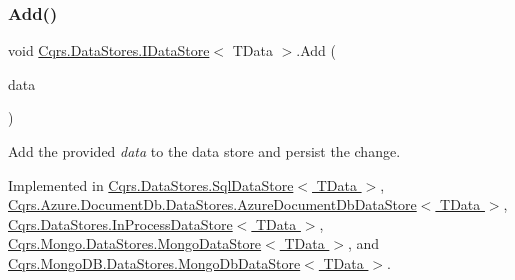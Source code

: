 \mbox{\label{interfaceCqrs_1_1DataStores_1_1IDataStore_a906f3f2f80db7a549a4170eca4653e26_a906f3f2f80db7a549a4170eca4653e26}} 
\subsubsection{\texorpdfstring{Add()}{Add()}\hspace{0.1cm}{\footnotesize\ttfamily [2/2]}}
{\footnotesize\ttfamily void \hyperlink{interfaceCqrs_1_1DataStores_1_1IDataStore}{Cqrs.\+Data\+Stores.\+I\+Data\+Store}$<$ T\+Data $>$.Add (\begin{DoxyParamCaption}\item[{I\+Enumerable$<$ T\+Data $>$}]{data }\end{DoxyParamCaption})}



Add the provided {\itshape data}  to the data store and persist the change. 



Implemented in \hyperlink{classCqrs_1_1DataStores_1_1SqlDataStore_a45aa105f2571510223c6073804690487_a45aa105f2571510223c6073804690487}{Cqrs.\+Data\+Stores.\+Sql\+Data\+Store$<$ T\+Data $>$}, \hyperlink{classCqrs_1_1Azure_1_1DocumentDb_1_1DataStores_1_1AzureDocumentDbDataStore_a2d91050f17273687e44a121623803e7a_a2d91050f17273687e44a121623803e7a}{Cqrs.\+Azure.\+Document\+Db.\+Data\+Stores.\+Azure\+Document\+Db\+Data\+Store$<$ T\+Data $>$}, \hyperlink{classCqrs_1_1DataStores_1_1InProcessDataStore_ad62504e478f0a907c18ec4aa9b42703a_ad62504e478f0a907c18ec4aa9b42703a}{Cqrs.\+Data\+Stores.\+In\+Process\+Data\+Store$<$ T\+Data $>$}, \hyperlink{classCqrs_1_1Mongo_1_1DataStores_1_1MongoDataStore_a38c242b255dc17cf8d19470fdf5a99bf_a38c242b255dc17cf8d19470fdf5a99bf}{Cqrs.\+Mongo.\+Data\+Stores.\+Mongo\+Data\+Store$<$ T\+Data $>$}, and \hyperlink{classCqrs_1_1MongoDB_1_1DataStores_1_1MongoDbDataStore_a709fc1e29d266a7c19a46bd181d03963_a709fc1e29d266a7c19a46bd181d03963}{Cqrs.\+Mongo\+D\+B.\+Data\+Stores.\+Mongo\+Db\+Data\+Store$<$ T\+Data $>$}.

\mbox{\label{interfaceCqrs_1_1DataStores_1_1IDataStore_aa7ade96f2f3151d5353cf7bdbb2baec5_aa7ade96f2f3151d5353cf7bdbb2baec5}} 
